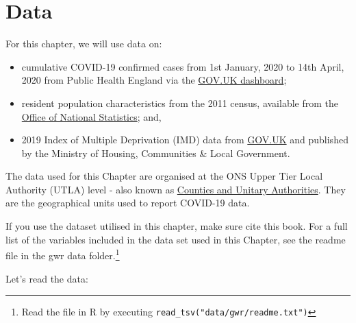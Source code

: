 \documentclass[
]{book}
\newenvironment{Shaded}{\begin{snugshade}}{\end{snugshade}}
\newcommand{\CommentTok}[1]{\textcolor[rgb]{0.56,0.35,0.01}{\textit{#1}}}
\newcommand{\DataTypeTok}[1]{\textcolor[rgb]{0.13,0.29,0.53}{#1}}
\newcommand{\DecValTok}[1]{\textcolor[rgb]{0.00,0.00,0.81}{#1}}
\newcommand{\FloatTok}[1]{\textcolor[rgb]{0.00,0.00,0.81}{#1}}
\newcommand{\KeywordTok}[1]{\textcolor[rgb]{0.13,0.29,0.53}{\textbf{#1}}}
\newcommand{\NormalTok}[1]{#1}
\newcommand{\OperatorTok}[1]{\textcolor[rgb]{0.81,0.36,0.00}{\textbf{#1}}}
\newcommand{\StringTok}[1]{\textcolor[rgb]{0.31,0.60,0.02}{#1}}
\begin{document}
\hypertarget{data-5}{%
\section{Data}\label{data-5}}

For this chapter, we will use data on:

\begin{itemize}
\item
  cumulative COVID-19 confirmed cases from 1st January, 2020 to 14th April, 2020 from Public Health England via the \href{https://coronavirus.data.gov.uk}{GOV.UK dashboard};
\item
  resident population characteristics from the 2011 census, available from the \href{https://www.nomisweb.co.uk/home/census2001.asp}{Office of National Statistics}; and,
\item
  2019 Index of Multiple Deprivation (IMD) data from \href{https://www.gov.uk/government/statistics/english-indices-of-deprivation-2019}{GOV.UK} and published by the Ministry of Housing, Communities \& Local Government.
\end{itemize}

The data used for this Chapter are organised at the ONS Upper Tier Local Authority (UTLA) level - also known as \href{https://geoportal.statistics.gov.uk/datasets/fe6bcee87d95476abc84e194fe088abb_0}{Counties and Unitary Authorities}. They are the geographical units used to report COVID-19 data.

If you use the dataset utilised in this chapter, make sure cite this book. For a full list of the variables included in the data set used in this Chapter, see the readme file in the gwr data folder.\footnote{Read the file in R by executing \texttt{read\_tsv("data/gwr/readme.txt")}}

Let's read the data:

\begin{Shaded}
\end{Shaded}
\end{document}
